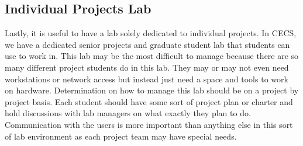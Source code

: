 \subsection{Individual Projects Lab}
Lastly, it is useful to have a lab solely dedicated to individual projects.  In CECS, we have a dedicated senior projects and graduate student lab that students can use to work in.  This lab may be the most difficult to manage because there are so many different project students do in this lab.  They may or may not even need workstations or network access but instead just need a space and tools to work on hardware.  Determination on how to manage this lab should be on a project by project basis.  Each student should have some sort of project plan or charter and hold discussions with lab managers on what exactly they plan to do.  Communication with the users is more important than anything else in this sort of lab environment as each project team may have special needs.  
